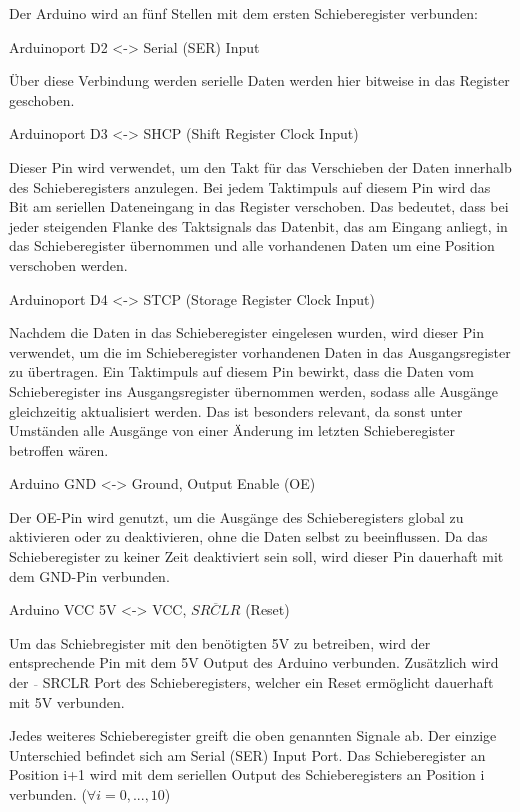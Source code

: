 Der Arduino wird an fünf Stellen mit dem ersten Schieberegister verbunden:

Arduinoport D2 <-> Serial (SER) Input

Über diese Verbindung werden serielle Daten werden hier bitweise in das Register geschoben.

Arduinoport D3 <-> SHCP (Shift Register Clock Input)

Dieser Pin wird verwendet, um den Takt für das Verschieben der Daten innerhalb des Schieberegisters anzulegen.
Bei jedem Taktimpuls auf diesem Pin wird das Bit am seriellen Dateneingang in das Register verschoben.
Das bedeutet, dass bei jeder steigenden Flanke des Taktsignals das Datenbit, das am Eingang anliegt, in das Schieberegister übernommen und alle vorhandenen Daten um eine Position verschoben werden.

Arduinoport D4 <-> STCP (Storage Register Clock Input)

Nachdem die Daten in das Schieberegister eingelesen wurden, wird dieser Pin verwendet, um die im Schieberegister vorhandenen Daten in das Ausgangsregister zu übertragen.
Ein Taktimpuls auf diesem Pin bewirkt, dass die Daten vom Schieberegister ins Ausgangsregister übernommen werden, sodass alle Ausgänge gleichzeitig aktualisiert werden.
Das ist besonders relevant, da sonst unter Umständen alle Ausgänge von einer Änderung im letzten Schieberegister betroffen wären.

Arduino GND <-> Ground, Output Enable (OE)

Der OE-Pin wird genutzt, um die Ausgänge des Schieberegisters global zu aktivieren oder zu deaktivieren, ohne die Daten selbst zu beeinflussen.
Da das Schieberegister zu keiner Zeit deaktiviert sein soll, wird dieser Pin dauerhaft mit dem GND-Pin verbunden.

Arduino VCC 5V <-> VCC, $\overline{SRCLR}$ (Reset)

Um das Schiebregister mit den benötigten 5V zu betreiben, wird der entsprechende Pin mit dem 5V Output des Arduino verbunden.
Zusätzlich wird der $\overline{ }$ SRCLR Port des Schieberegisters, welcher ein Reset ermöglicht dauerhaft mit 5V verbunden.

Jedes weiteres Schieberegister greift die oben genannten Signale ab.
Der einzige Unterschied befindet sich am Serial (SER) Input Port.
Das Schieberegister an Position i+1 wird mit dem seriellen Output des Schieberegisters an Position i verbunden. ($\forall i = 0,...,10$)

